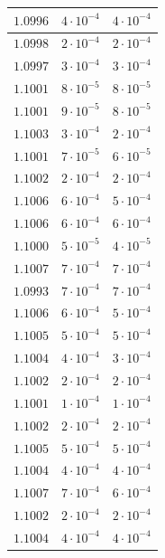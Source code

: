 \begin{table}[h]
\begin{tabular}{|c|c|c|}
       \hline
       $1.0996$ & $4 \cdot 10^{-4}$ & $4 \cdot 10^{-4}$ \\
       \hline
       $1.0998$ & $2 \cdot 10^{-4}$ & $2 \cdot 10^{-4}$ \\
       \hline
       $1.0997$ & $3 \cdot 10^{-4}$ & $3 \cdot 10^{-4}$ \\
       \hline
       $1.1001$ & $8 \cdot 10^{-5}$ & $8 \cdot 10^{-5}$ \\
       \hline
       $1.1001$ & $9 \cdot 10^{-5}$ & $8 \cdot 10^{-5}$ \\
       \hline
       $1.1003$ & $3 \cdot 10^{-4}$ & $2 \cdot 10^{-4}$ \\
       \hline
       $1.1001$ & $7 \cdot 10^{-5}$ & $6 \cdot 10^{-5}$ \\
       \hline
       $1.1002$ & $2 \cdot 10^{-4}$ & $2 \cdot 10^{-4}$ \\
       \hline
       $1.1006$ & $6 \cdot 10^{-4}$ & $5 \cdot 10^{-4}$ \\
       \hline
       $1.1006$ & $6 \cdot 10^{-4}$ & $6 \cdot 10^{-4}$ \\
       \hline
       $1.1000$ & $5 \cdot 10^{-5}$ & $4 \cdot 10^{-5}$ \\
       \hline
       $1.1007$ & $7 \cdot 10^{-4}$ & $7 \cdot 10^{-4}$ \\
       \hline
       $1.0993$ & $7 \cdot 10^{-4}$ & $7 \cdot 10^{-4}$ \\
       \hline
       $1.1006$ & $6 \cdot 10^{-4}$ & $5 \cdot 10^{-4}$ \\
       \hline
       $1.1005$ & $5 \cdot 10^{-4}$ & $5 \cdot 10^{-4}$ \\
       \hline
       $1.1004$ & $4 \cdot 10^{-4}$ & $3 \cdot 10^{-4}$ \\
       \hline
       $1.1002$ & $2 \cdot 10^{-4}$ & $2 \cdot 10^{-4}$ \\
       \hline
       $1.1001$ & $1 \cdot 10^{-4}$ & $1 \cdot 10^{-4}$ \\
       \hline
       $1.1002$ & $2 \cdot 10^{-4}$ & $2 \cdot 10^{-4}$ \\
       \hline
       $1.1005$ & $5 \cdot 10^{-4}$ & $5 \cdot 10^{-4}$ \\
       \hline
       $1.1004$ & $4 \cdot 10^{-4}$ & $4 \cdot 10^{-4}$ \\
       \hline
       $1.1007$ & $7 \cdot 10^{-4}$ & $6 \cdot 10^{-4}$ \\
       \hline
       $1.1002$ & $2 \cdot 10^{-4}$ & $2 \cdot 10^{-4}$ \\
       \hline
       $1.1004$ & $4 \cdot 10^{-4}$ & $4 \cdot 10^{-4}$ \\
       \hline
   \end{tabular}
\end{table}


